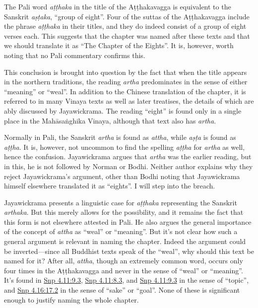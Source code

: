 \documentclass[12pt,openany]{book}%
\begin{document}
The Pali word \textit{\textsanskrit{aṭṭhaka}} in the title of the \textsanskrit{Aṭṭhakavagga} is equivalent to the Sanskrit \textit{\textsanskrit{aṣṭaka}}, “group of eight”. Four of the suttas of the \textsanskrit{Aṭṭhakavagga} include the phrase \textit{\textsanskrit{aṭṭhaka}} in their titles, and they do indeed consist of a group of eight verses each. This suggests that the chapter was named after these texts and that we should translate it as “The Chapter of the Eights”. It is, however, worth noting that no Pali commentary confirms this.

This conclusion is brought into question by the fact that when the title appears in the northern traditions, the reading \textit{artha} predominates in the sense of either “meaning” or “weal”. In addition to the Chinese translation of the chapter, it is referred to in many Vinaya texts as well as later treatises, the details of which are ably discussed by Jayawickrama. The reading “eight” is found only in a single place in the \textsanskrit{Mahāsaṅghika} Vinaya, although that text also has \textit{artha}.

Normally in Pali, the Sanskrit \textit{artha} is found as \textit{attha}, while \textit{\textsanskrit{aṣṭa}} is found as \textit{\textsanskrit{aṭṭha}}. It is, however, not uncommon to find the spelling \textit{\textsanskrit{aṭṭha}} for \textit{artha} as well, hence the confusion. Jayawickrama argues that \textit{artha} was the earlier reading, but in this, he is not followed by Norman or Bodhi. Neither author explains why they reject Jayawickrama’s argument, other than Bodhi noting that Jayawickrama himself elsewhere translated it as “eights”. I will step into the breach.

Jayawickrama presents a linguistic case for \textit{\textsanskrit{aṭṭhaka}} representing the Sanskrit \textit{arthaka}. But this merely allows for the possibility, and it remains the fact that this form is not elsewhere attested in Pali. He also argues the general importance of the concept of \textit{attha} as “weal” or “meaning”. But it’s not clear how such a general argument is relevant in naming the chapter. Indeed the argument could be inverted—since all Buddhist texts speak of the “weal”, why should this text be named for it? After all, \textit{attha}, though an extremely common word, occurs only four times in the \textsanskrit{Aṭṭhakavagga} and never in the sense of “weal” or “meaning”. It’s found in \href{https://suttacentral.net/snp4.11/en/sujato\#9.3}{Snp 4.11:9.3}, \href{https://suttacentral.net/snp4.11/en/sujato\#8.3}{Snp 4.11:8.3}, and \href{https://suttacentral.net/snp4.11/en/sujato\#9.3}{Snp 4.11:9.3} in the sense of “topic”, and \href{https://suttacentral.net/snp4.16/en/sujato\#17.2}{Snp 4.16:17.2} in the sense of “sake” or “goal”. None of these is significant enough to justify naming the whole chapter.
\end{document}
